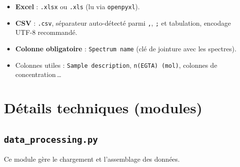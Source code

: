\documentclass[12pt, a4paper]{article}
\begin{document}
\begin{itemize}
  \item \textbf{Excel} : \texttt{.xlsx} ou \texttt{.xls} (lu via
        \texttt{openpyxl}).
  \item \textbf{CSV} : \texttt{.csv}, séparateur auto-détecté parmi
        \texttt{,}, \texttt{;} et tabulation, encodage UTF-8 recommandé.
  \item \textbf{Colonne obligatoire} : \texttt{Spectrum name} (clé de
        jointure avec les spectres).
  \item Colonnes utiles :
    \texttt{Sample description}, \texttt{n(EGTA) (mol)},
    colonnes de concentration\,\ldots
\end{itemize}

\section{Détails techniques (modules)}

\subsection{\texttt{data\_processing.py}}

Ce module gère le chargement et l'assemblage des données.
\end{document}
